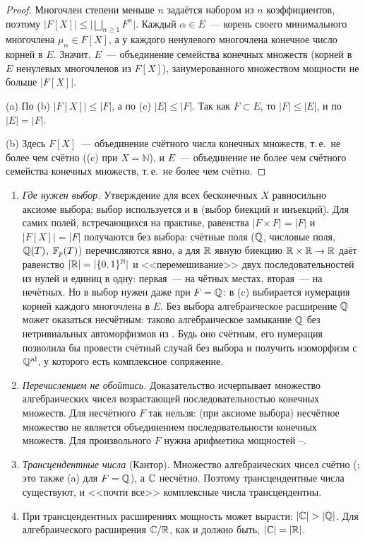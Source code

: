 \begin{proof}
Многочлен степени меньше $n$ задаётся набором из $n$ коэффициентов, поэтому
$|F[X]|\le\bigl|\bigsqcup_{n\ge1}F^n\bigr|$. Каждый $\alpha\in E$~--- корень своего минимального многочлена
$\mu_\alpha\in F[X]$, а у каждого ненулевого многочлена конечное число корней в $E$. Значит, $E$~--- объединение
семейства конечных множеств (корней в $E$ ненулевых многочленов из $F[X]$), занумерованного множеством мощности не
больше $|F[X]|$.

(a) По (b) $|F[X]|\le|F|$, а по (c) $|E|\le|F|$. Так как $F\subset E$, то $|F|\le|E|$, и по  $|E|=|F|$.

(b) Здесь $F[X]$~--- объединение счётного числа конечных множеств, т.\,е.\ не более чем счётно ((c) при
$X=\mathbb N$), и $E$~--- объединение не
более чем счётного семейства конечных множеств, т.\,е.\ не более чем счётно.
\end{proof}

\begin{remark}[6.4i]
\begin{enumerate}[label=(\alph*),leftmargin=*]
\item \emph{Где нужен выбор.} Утверждение  для всех бесконечных $X$ равносильно аксиоме выбора; выбор используется и
в  (выбор биекций и инъекций). Для самих полей, встречающихся на практике, равенства $|F\times F|=|F|$ и
$|F[X]|=|F|$ получаются без выбора: счётные поля ($\mathbb Q$, числовые поля, $\mathbb Q(T)$, $\mathbb F_p(T)$) перечисляются явно, а для
$\mathbb R$ явную биекцию $\mathbb R\times\mathbb R\to\mathbb R$ даёт равенство $|\mathbb R|=|\{0,1\}^{\mathbb N}|$ и <<перемешивание>> двух
последовательностей из нулей и единиц в одну: первая~--- на чётных местах, вторая~--- на нечётных. Но в  выбор
нужен даже при $F=\mathbb Q$: в (c) выбирается нумерация корней каждого многочлена в $E$. Без выбора алгебраическое
расширение $\mathbb Q$ может оказаться несчётным: таково алгебраическое замыкание $\mathbb Q$ без нетривиальных автоморфизмов из
. Будь оно счётным, его нумерация позволила бы провести счётный случай  без выбора и получить
изоморфизм с $\mathbb Q^{\mathrm{al}}$, у которого есть комплексное сопряжение.
\item \emph{Перечислением не обойтись.} Доказательство  исчерпывает множество алгебраических чисел возрастающей
последовательностью конечных множеств. Для несчётного $F$ так нельзя: (при аксиоме выбора) несчётное множество не является
объединением последовательности конечных множеств. Для произвольного $F$ нужна арифметика мощностей --.
\item \emph{Трансцендентные числа} (Кантор). Множество алгебраических чисел счётно (; это также (a) для
$F=\mathbb Q$), а $\mathbb C$ несчётно. Поэтому трансцендентные числа существуют, и <<почти все>> комплексные числа трансцендентны.
\item При трансцендентных расширениях мощность может вырасти: $|\CC|>|\Q|$. Для алгебраического расширения $\mathbb C/\mathbb R$, как
и должно быть, $|\mathbb C|=|\mathbb R|$.
\end{enumerate}
\end{remark}
